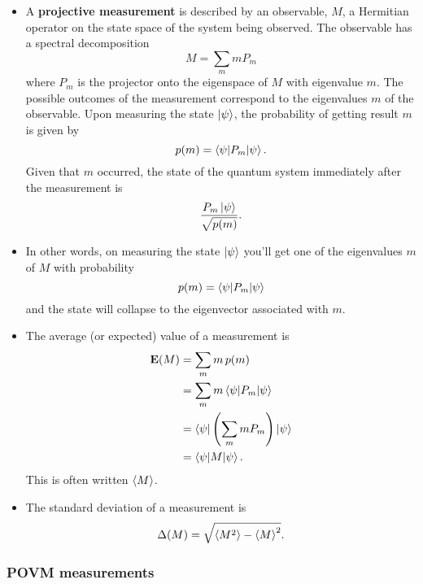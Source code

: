 \documentclass{article}
\renewcommand{\vec}[1]{\boldsymbol{\mathbf{#1}}}
\begin{document}
\begin{itemize}
  \item A \textbf{projective measurement} is described by an observable, $M$, a Hermitian operator on the state space of the system being observed. The observable has a spectral decomposition \[M = \sum_m m P_m\] where $P_m$ is the projector onto the eigenspace of $M$ with eigenvalue $m$. The possible outcomes of the measurement correspond to the eigenvalues $m$ of the observable. Upon measuring the state $\ket{\psi}$, the probability of getting result $m$ is given by \[p(m) = \braket{\psi | P_m | \psi}.\] Given that $m$ occurred, the state of the quantum system immediately after the measurement is \[\frac{P_m \ket{\psi}}{\sqrt{p(m)}}.\]

  \item In other words, on measuring the state $\ket{\psi}$ you'll get one of the eigenvalues $m$ of $M$ with probability \[p(m) = \braket{\psi | P_m | \psi}\] and the state will collapse to the eigenvector associated with $m$.

  \item The average (or expected) value of a measurement is \begin{align*}
          \vec{E}(M) & = \sum_m m \,p(m)                                   \\
                     & = \sum_m m \braket{\psi | P_m | \psi}               \\
                     & = \bra{\psi} \left( \sum_m m P_m \right) \ket{\psi} \\
                     & = \braket{\psi | M | \psi}.
        \end{align*} This is often written $\braket{M}$.

  \item The standard deviation of a measurement is \[\Delta(M) = \sqrt{\braket{M^2} - \braket{M}^2}.\]
\end{itemize}

\subsubsection{POVM measurements}
\end{document}
